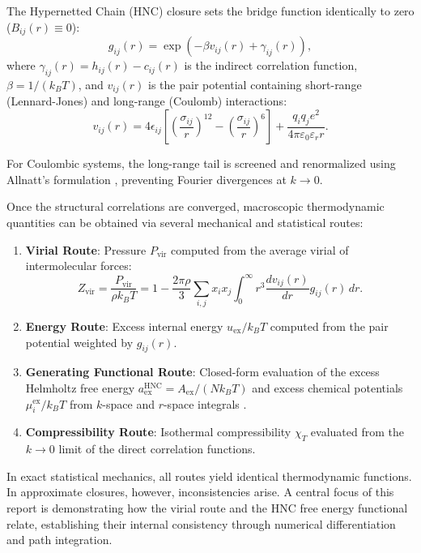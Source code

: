\documentclass[11pt,a4paper]{article}
\begin{document}
The Hypernetted Chain (HNC) closure sets the bridge function identically to zero ($B_{ij}(r) \equiv 0$):
\begin{equation}
\label{eq:hnc_closure}
g_{ij}(r) = \exp\left( -\beta v_{ij}(r) + \gamma_{ij}(r) \right),
\end{equation}
where $\gamma_{ij}(r) = h_{ij}(r) - c_{ij}(r)$ is the indirect correlation function, $\beta = 1/(k_B T)$, and $v_{ij}(r)$ is the pair potential containing short-range (Lennard-Jones) and long-range (Coulomb) interactions:
\begin{equation}
v_{ij}(r) = 4\epsilon_{ij} \left[ \left(\frac{\sigma_{ij}}{r}\right)^{12} - \left(\frac{\sigma_{ij}}{r}\right)^6 \right] + \frac{q_i q_j e^2}{4\pi\varepsilon_0 \varepsilon_r r}.
\end{equation}

For Coulombic systems, the long-range tail is screened and renormalized using Allnatt's formulation \cite{Allnatt1964}, preventing Fourier divergences at $k \to 0$.

Once the structural correlations are converged, macroscopic thermodynamic quantities can be obtained via several mechanical and statistical routes:
\begin{enumerate}
    \item \textbf{Virial Route}: Pressure $P_{\text{vir}}$ computed from the average virial of intermolecular forces:
    \begin{equation}
    Z_{\text{vir}} = \frac{P_{\text{vir}}}{\rho k_B T} = 1 - \frac{2\pi \rho}{3} \sum_{i,j} x_i x_j \int_0^{\infty} r^3 \frac{dv_{ij}(r)}{dr} g_{ij}(r) \, dr.
    \end{equation}
    \item \textbf{Energy Route}: Excess internal energy $u_{\text{ex}} / k_B T$ computed from the pair potential weighted by $g_{ij}(r)$.
    \item \textbf{Generating Functional Route}: Closed-form evaluation of the excess Helmholtz free energy $a_{\text{ex}}^{\text{HNC}} = A_{\text{ex}} / (N k_B T)$ and excess chemical potentials $\mu_i^{\text{ex}} / k_B T$ from $k$-space and $r$-space integrals \cite{Morita1961, Singer1985, Lomba1989}.
    \item \textbf{Compressibility Route}: Isothermal compressibility $\chi_T$ evaluated from the $k \to 0$ limit of the direct correlation functions.
\end{enumerate}

In exact statistical mechanics, all routes yield identical thermodynamic functions. In approximate closures, however, inconsistencies arise. A central focus of this report is demonstrating how the virial route and the HNC free energy functional relate, establishing their internal consistency through numerical differentiation and path integration.
\end{document}
